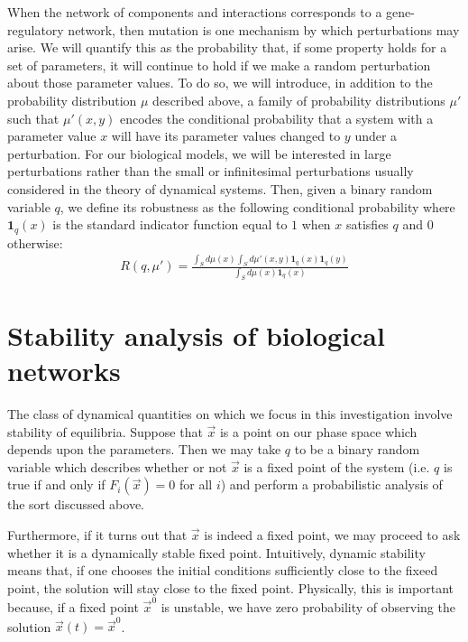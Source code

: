 When the network of components and interactions corresponds to a gene-regulatory network, then mutation is one mechanism by which perturbations may arise.  We will quantify this as the probability that, if some property holds for a set of parameters, it will continue to hold if we make a random perturbation about those parameter values. To do so, we will introduce, in addition to the probability distribution $\mu$ described above, a family of probability distributions $\mu'$ such that $\mu'(x,y)$ encodes the conditional probability that a system with a parameter value $x$ will have its parameter values changed to $y$ under a perturbation.  For our biological models, we will be interested in large perturbations rather than the small or infinitesimal perturbations usually considered in the theory of dynamical systems.  Then, given a binary random variable $q$, we define its robustness as the following conditional probability where $\mathbf{1}_q(x)$ is the standard indicator function equal to $1$ when $x$ satisfies $q$ and $0$ otherwise:
\begin{align}\label{eq:robustness}
  R (q,\mu') =
  \frac{\int_S d\mu(x) \int_S d\mu'(x,y) \mathbf{1}_q(x) \mathbf{1}_q(y)}
  {\int_S d\mu(x) \mathbf{1}_q(x)}
\end{align}

\section{Stability analysis of biological networks}
The class of dynamical quantities on which we focus in this
investigation involve stability of equilibria.  Suppose that $\vec x$
is a point on our phase space which depends upon the parameters.  Then
we may take $q$ to be a binary random variable which describes whether
or not $\vec x$ is a fixed point of the system (i.e. $q$ is true if and only if
$F_i(\vec{x})=0$ for all $i$) and perform a probabilistic analysis
of the sort discussed above.

Furthermore, if it turns out that $\vec x$ is indeed a fixed point, we
may proceed to ask whether it is a dynamically stable fixed point.
Intuitively, dynamic stability means that, if one chooses the initial
conditions sufficiently close to the fixeed point, the solution will
stay close to the fixed point.  Physically, this is important because,
if a fixed point ${\vec x}^0$ is unstable, we have zero probability of
observing the solution ${\vec x}(t) = {\vec x}^0$.

